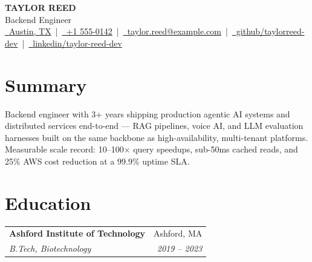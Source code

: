 \documentclass[11pt]{article}
\makeatletter
\newcommand{\resumeentry}[4]{%
  \begin{tabular*}{\textwidth}{@{}l@{\extracolsep{\fill}}r@{}}
    \textbf{#1} & #2 \\
    \textit{#3} & \textit{#4} \\
  \end{tabular*}\vspace{1pt}%
}
\makeatother
\begin{document}
\fontsize{10.0}{12.0}\selectfont

\begin{center}
  {\LARGE\bfseries TAYLOR REED} \\[2pt]
  {\large Backend Engineer} \\[3pt]
  \href{https://maps.google.com/?q=Austin,TX}{\faMapMarker*\ Austin, TX}
  \,|\, \href{tel:+15550142}{\faPhone\ +1 555-0142}
  \,|\, \href{mailto:taylor.reed@example.com}{\faEnvelope\ taylor.reed@example.com}
  \,|\, \href{https://github.com/taylorreed-dev}{\faGithub\ github/taylorreed-dev}
  \,|\, \href{https://www.linkedin.com/in/taylor-reed-dev/}{\faLinkedin\ linkedin/taylor-reed-dev}
\end{center}

\section{Summary}
Backend engineer with 3+ years shipping production agentic AI systems and distributed services end-to-end --- RAG pipelines, voice AI, and LLM evaluation harnesses built on the same backbone as high-availability, multi-tenant platforms. Measurable scale record: 10--100$\times$ query speedups, sub-50ms cached reads, and 25\% AWS cost reduction at a 99.9\% uptime SLA.

\section{Education}
\resumeentry{Ashford Institute of Technology}{Ashford, MA}{B.Tech, Biotechnology}{2019 -- 2023}
\end{document}
